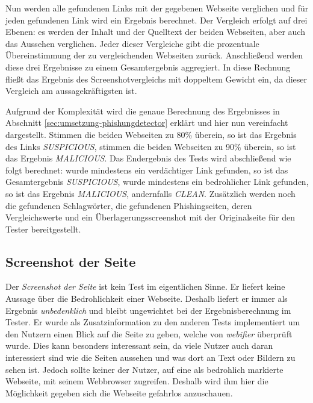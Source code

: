 Nun werden alle gefundenen Links mit der gegebenen Webseite verglichen und für jeden gefundenen Link
wird ein Ergebnis berechnet. Der Vergleich erfolgt auf drei Ebenen: es werden der Inhalt und der
Quelltext der beiden Webseiten, aber auch das Aussehen verglichen. Jeder dieser Vergleiche gibt die
prozentuale Übereinstimmung der zu vergleichenden Webseiten zurück. Anschließend werden diese drei
Ergebnisse zu einem Gesamtergebnis aggregiert. In diese Rechnung fließt das Ergebnis des
Screenshotvergleichs mit doppeltem Gewicht ein, da dieser Vergleich am aussagekräftigsten ist.

Aufgrund der Komplexität wird die genaue Berechnung des Ergebnisses in Abschnitt \ref{sec:umsetzung-phishungdetector} erklärt und hier nun vereinfacht dargestellt. Stimmen die beiden Webseiten zu 80\% überein, so ist das Ergebnis des Links \textit{SUSPICIOUS}, stimmen die beiden Webseiten zu 90\% überein, so ist das Ergebnis \textit{MALICIOUS}. Das Endergebnis des Tests wird abschließend wie folgt berechnet: wurde mindestens ein verdächtiger Link gefunden, so ist das Gesamtergebnis \textit{SUSPICIOUS}, wurde mindestens ein bedrohlicher Link gefunden, so ist das Ergebnis \textit{MALICIOUS}, andernfalls \textit{CLEAN}. Zusätzlich werden noch die gefundenen Schlagwörter, die gefundenen Phishingseiten, deren Vergleichswerte und ein Überlagerungsscreenshot mit der Originalseite für den Tester bereitgestellt.

\subsection{Screenshot der Seite}
Der \textit{Screenshot der Seite} ist kein Test im eigentlichen Sinne. Er liefert keine Aussage über
die Bedrohlichkeit einer Webseite. Deshalb liefert er immer als Ergebnis \textit{unbedenklich} und
bleibt ungewichtet bei der Ergebnisberechnung im Tester. Er wurde als Zusatzinformation zu den
anderen Tests implementiert um den Nutzern einen Blick auf die Seite zu geben, welche von
\textit{webifier} überprüft wurde.
Dies kann besonders interessant sein, da viele Nutzer auch daran interessiert sind wie die Seiten
aussehen und was dort an Text oder Bildern zu sehen ist. Jedoch sollte keiner der Nutzer, auf
eine als bedrohlich markierte Webseite, mit seinem Webbrowser zugreifen. Deshalb wird ihm hier die
Möglichkeit gegeben sich die Webseite gefahrlos anzuschauen.
